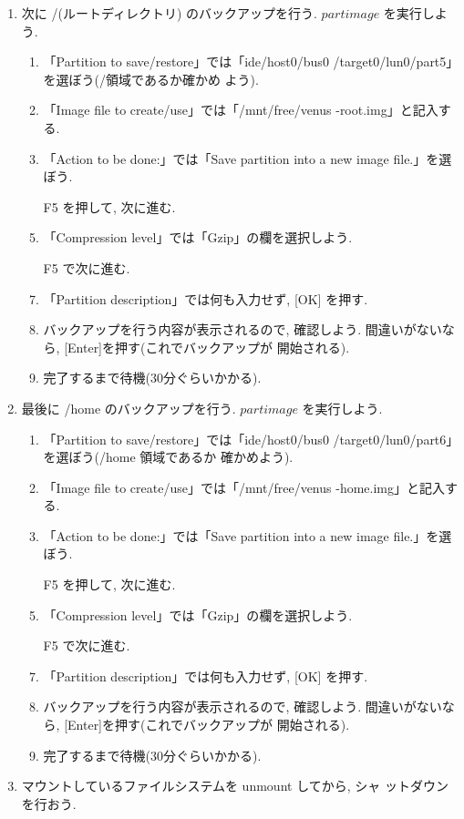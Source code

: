 \documentclass{jarticle}
\begin{document}
\begin{enumerate}
\item 次に /(ルートディレクトリ) のバックアップを行う.
      $partimage$ を実行しよう.

      \begin{enumerate}
      \item 「Partition to save/restore」では「ide/host0/bus0
             /target0/lun0/part5」を選ぼう(/領域であるか確かめ
             よう).
      \item 「Image file to create/use」では「/mnt/free/venus
             -root.img」と記入する.
      \item 「Action to be done:」では「Save partition into a
             new image file.」を選ぼう.
      \item [F5]を押して, 次に進む.
      \item 「Compression level」では「Gzip」の欄を選択しよう.
      \item [F5]で次に進む.
      \item 「Partition description」では何も入力せず, [OK]
            を押す.
      \item バックアップを行う内容が表示されるので, 確認しよう.
            間違いがないなら, [Enter]を押す(これでバックアップが
            開始される).
      \item 完了するまで待機(30分ぐらいかかる).
      \end{enumerate}

\item 最後に /home のバックアップを行う.
      $partimage$ を実行しよう.

      \begin{enumerate}
      \item 「Partition to save/restore」では「ide/host0/bus0
             /target0/lun0/part6」を選ぼう(/home 領域であるか
             確かめよう).
      \item 「Image file to create/use」では「/mnt/free/venus
             -home.img」と記入する.
      \item 「Action to be done:」では「Save partition into a
             new image file.」を選ぼう.
      \item [F5]を押して, 次に進む.
      \item 「Compression level」では「Gzip」の欄を選択しよう.
      \item [F5]で次に進む.
      \item 「Partition description」では何も入力せず, [OK]
            を押す.
      \item バックアップを行う内容が表示されるので, 確認しよう.
            間違いがないなら, [Enter]を押す(これでバックアップが
            開始される).
      \item 完了するまで待機(30分ぐらいかかる).
      \end{enumerate}
\item マウントしているファイルシステムを unmount してから, シャ
      ットダウンを行おう.


\end{enumerate}
\end{document}
